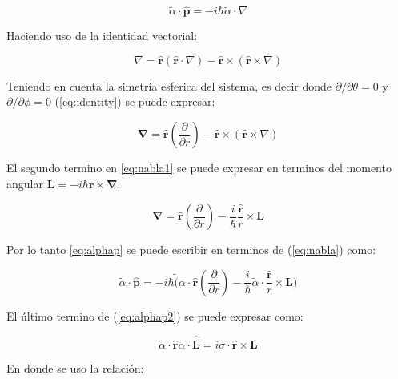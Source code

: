 \documentclass[a4paper, 12pt]{article} %
\begin{document}
\begin{equation}\label{eq:alphap}
\widetilde{\alpha} \cdot \hat{\mathbf{p}} = -i \hbar \widetilde{\alpha} \cdot \nabla
\end{equation}

Haciendo uso de la identidad vectorial: 

\begin{equation}\label{eq:identity}
\nabla = \hat{\mathbf{r}}(\hat{\mathbf{r}}\cdot \nabla) - \hat{\mathbf{r}} \times (\hat{\mathbf{r}} \times \nabla)  
\end{equation}

Teniendo en cuenta la simetr\'ia esferica del sistema, es decir donde $\partial/\partial \theta = 0$
y $\partial/\partial \phi = 0$  (\ref{eq:identity}) se puede expresar:

\begin{equation}\label{eq:nabla1}
\mathbf\nabla = \hat{\mathbf{r}}(\dfrac{\partial}{\partial r}) - \hat{\mathbf{r}} \times (\hat{\mathbf{r}} \times \nabla)
\end{equation}

El segundo termino en \ref{eq:nabla1} se puede expresar en terminos del momento angular $\mathbf{L} = -i\hbar \mathbf{r} \times \mathbf{\nabla}$.

\begin{equation}\label{eq:nabla}
\mathbf{\nabla} =  \hat{\mathbf{r}}(\dfrac{\partial}{\partial r}) - \dfrac{i}{\hbar}\dfrac{\hat{\mathbf{r}}}{r} \times \mathbf{L}
\end{equation}

Por lo tanto \ref{eq:alphap} se puede escribir en terminos de (\ref{eq:nabla}) como:

\begin{equation}\label{eq:alphap2}
\widetilde{\alpha}\cdot \mathbf{\hat{p}} = -i\hbar \widetilde({\alpha}\cdot \hat{\mathbf{r}}(\dfrac{\partial}{\partial r}) - 
\dfrac{i}{\hbar}\widetilde{\alpha}\cdot \dfrac{\hat{\mathbf{r}}}{r} \times \mathbf{L})
\end{equation}

El \'ultimo termino de (\ref{eq:alphap2}) se puede expresar como:

\begin{equation}\label{eq:prop1}
\widetilde{\alpha}\cdot\hat{\mathbf{r}}\widetilde{\alpha} \cdot \hat{\mathbf{L}} = i\widetilde{\sigma}\cdot \hat{\mathbf{r}} \times \mathbf{L}
\end{equation}

En donde se uso la relaci\'on:
\end{document}
